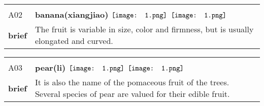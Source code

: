 \documentclass[UTF8]{article}
\begin{document}
            \begin{tabularx}{\textwidth}{p{1.5cm}X}
            \arrayrulecolor{myBlue}
        	\hline\\
            \small{A02}&
            \large{\bfseries{banana(xiangjiao)}}\hfill
                                                            $\vcenter{\hbox{\texttt{[image: 1.png]}}}$
                                                                \phantom{$\vcenter{\hbox{\texttt{[image: 1.png]}}}$}
                                                                \phantom{$\vcenter{\hbox{\texttt{[image: 1.png]}}}$}
                                                                $\vcenter{\hbox{\texttt{[image: 1.png]}}}$
                                                                \phantom{$\vcenter{\hbox{\texttt{[image: 1.png]}}}$}
                                                                \phantom{$\vcenter{\hbox{\texttt{[image: 1.png]}}}$}
                                                                \phantom{$\vcenter{\hbox{\texttt{[image: 1.png]}}}$}
                                        \\[10pt]
            \large{\bfseries{brief}}&\noindent\parbox[c]{\hsize}{The fruit is variable in size, color and firmness, but is usually elongated and curved.} \\[5pt]
            \hline\\[-10pt]
        \end{tabularx}
            \begin{tabularx}{\textwidth}{p{1.5cm}X}
            \arrayrulecolor{myBlue}
        	\hline\\
            \small{A03}&
            \large{\bfseries{pear(li)}}\hfill
                                                            $\vcenter{\hbox{\texttt{[image: 1.png]}}}$
                                                                \phantom{$\vcenter{\hbox{\texttt{[image: 1.png]}}}$}
                                                                $\vcenter{\hbox{\texttt{[image: 1.png]}}}$
                                                                \phantom{$\vcenter{\hbox{\texttt{[image: 1.png]}}}$}
                                                                \phantom{$\vcenter{\hbox{\texttt{[image: 1.png]}}}$}
                                                                \phantom{$\vcenter{\hbox{\texttt{[image: 1.png]}}}$}
                                                                \phantom{$\vcenter{\hbox{\texttt{[image: 1.png]}}}$}
                                        \\[10pt]
            \large{\bfseries{brief}}&\noindent\parbox[c]{\hsize}{It is also the name of the pomaceous fruit of the trees. Several species of pear are valued for their edible fruit.} \\[5pt]
            \hline\\[-10pt]
        \end{tabularx}
\end{document}
